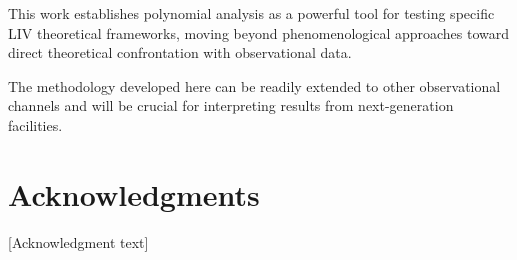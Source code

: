 \documentclass[12pt]{article}
\begin{document}
This work establishes polynomial analysis as a powerful tool for testing specific LIV theoretical frameworks, moving beyond phenomenological approaches toward direct theoretical confrontation with observational data.

The methodology developed here can be readily extended to other observational channels and will be crucial for interpreting results from next-generation facilities.

\section*{Acknowledgments}

[Acknowledgment text]



\end{document}
